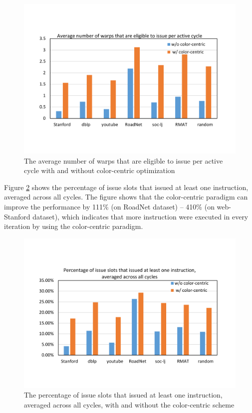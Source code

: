\begin{figure}[h]
	\centering
		\includegraphics[scale=0.25]{figure/exp/warps.pdf}
	\caption{The average number of warps that are eligible to issue per active cycle with and without color-centric optimization}
	\label{fig:warps}%
\end{figure}

Figure \ref{fig:slot_utilization} shows the percentage of issue slots that issued at least one instruction, averaged across all cycles. The figure shows that the color-centric paradigm can improve the performance by 111\% (on RoadNet dataset) -- 410\% (on web-Stanford dataset), which indicates that more instruction were executed in every iteration by using the color-centric paradigm.

\begin{figure}[h]
	\centering
		\includegraphics[scale=0.25]{figure/exp/slot_utilization.pdf}
	\caption{The percentage of issue slots that issued at least one instruction, averaged across all cycles, with and without the color-centric scheme}
	\label{fig:slot_utilization}%
\end{figure}

